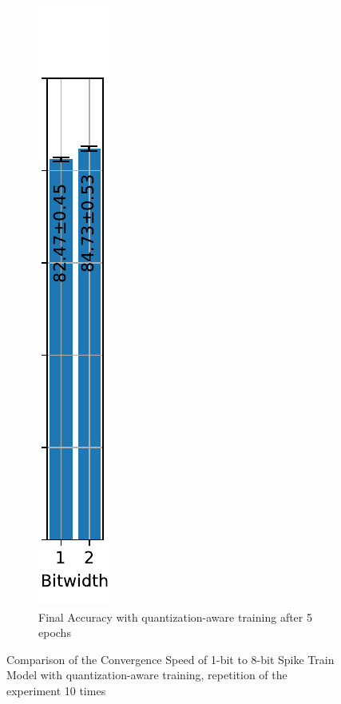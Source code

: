 \begin{figure}[!htpb]
\begin{subfigure}[H]{0.1\textwidth}
            \includegraphics[width=\textwidth]{../quantized/FashionMNIST/plots/fashionmnist_final_acc.pdf}
            \caption{Final Accuracy with quantization-aware training after 5 epochs}
            \label{fig:quantization_aware_final_acc}
        \end{subfigure}
        \caption{Comparison of the Convergence Speed of 1-bit to 8-bit Spike Train Model with quantization-aware training, repetition of the experiment 10 times}
        \label{fig:quantization_aware}
    \end{figure}

